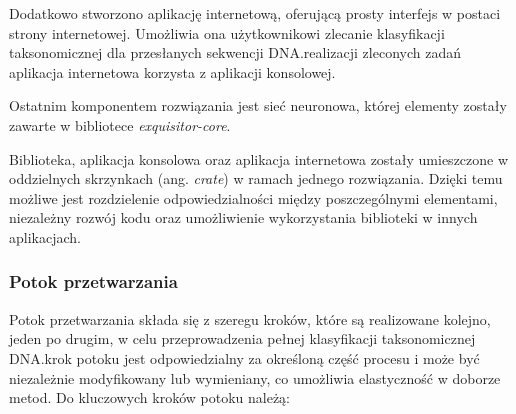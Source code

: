         Dodatkowo stworzono aplikację internetową, oferującą prosty interfejs w postaci strony internetowej. Umożliwia ona użytkownikowi zlecanie klasyfikacji taksonomicznej dla przesłanych sekwencji DNA.\@Do realizacji zleconych zadań aplikacja internetowa korzysta z aplikacji konsolowej.

        Ostatnim komponentem rozwiązania jest sieć neuronowa, której elementy zostały zawarte w bibliotece \textit{exquisitor-core}. 

        Biblioteka, aplikacja konsolowa oraz aplikacja internetowa zostały umieszczone w oddzielnych skrzynkach (ang. \textit{crate}) w ramach jednego rozwiązania. Dzięki temu możliwe jest rozdzielenie odpowiedzialności między poszczególnymi elementami, niezależny rozwój kodu oraz umożliwienie wykorzystania biblioteki w innych aplikacjach.


        \subsubsection{Potok przetwarzania}

            Potok przetwarzania składa się z szeregu kroków, które są realizowane kolejno, jeden po drugim, w celu przeprowadzenia pełnej klasyfikacji taksonomicznej DNA. krok potoku jest odpowiedzialny za określoną część procesu i może być niezależnie modyfikowany lub wymieniany, co umożliwia elastyczność w doborze metod. Do kluczowych kroków potoku należą:

